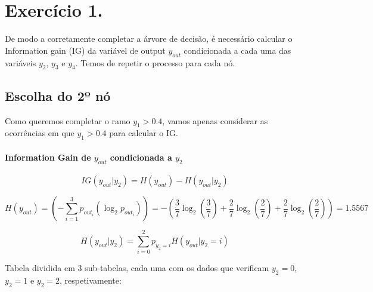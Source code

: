 \documentclass{article}
\begin{document}
\newpage

\section*{Exercício 1.}

De modo a corretamente completar a árvore de decisão, é necessário calcular o Information gain (IG) da variável de output $y_{out}$ condicionada a cada uma das variáveis $y_2$, $y_3$ e $y_4$. 
Temos de repetir o processo para cada nó.

\subsection*{Escolha do 2º nó}

Como queremos completar o ramo $y_1>0.4$, vamos apenas considerar as ocorrências em que $y_1>0.4$ para calcular o IG.

\paragraph{Information Gain de $y_{out}$ condicionada a $y_2$}

\[ IG(y_{out}|y_2) = H(y_{out}) - H(y_{out}|y_2) \]

\[ H(y_{out}) = \left(- \sum_{i=1}^{3} p_{out_i} (\log_2 p_{out_i})\right) = - \left( \frac{3}{7} \log_2 \left( \frac{3}{7} \right) + \frac{2}{7} \log_2 \left( \frac{2}{7} \right) + \frac{2}{7} \log_2 \left( \frac{2}{7} \right) \right) = 1.5567 \]

\[ H(y_{out}|y_2) = \sum_{i=0}^{2} p_{y_2 = i} H(y_{out}|y_2 = i) \]

Tabela dividida em 3 sub-tabelas, cada uma com os dados que verificam $y_2 = 0$, $y_2 = 1$ e $y_2 = 2$, respetivamente:
\end{document}
